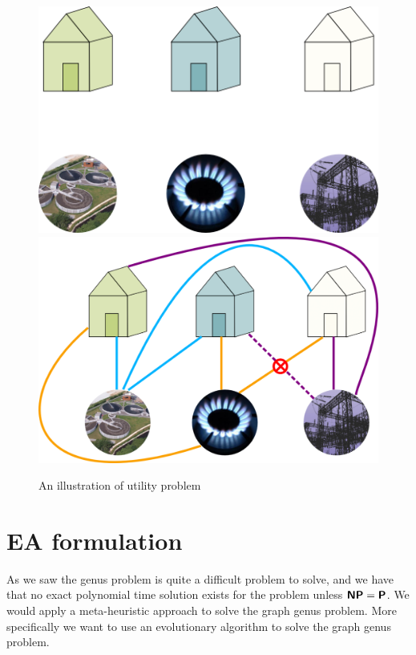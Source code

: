 \documentclass{article}
\newcommand{\classX}[1]{\ensuremath{\text{\textsf{\textbf{#1}}}}}
\newcommand{\classP}{\classX{P}}
\newcommand{\classNP}{\classX{NP}}
\begin{document}
    \begin{figure}[h]
        \centering
        \includegraphics[scale = 0.2]{The-Utilities-Problem.png} 
        \hspace*{1cm}
        \includegraphics[scale = 0.2]{The-Utilities-Problem-Bad-Solution.png} 
        \caption{An illustration of utility problem}
        \label{Fig1}
    \end{figure}
    
\section{EA formulation}\label{sec: EA}

    As we saw the genus problem is quite a difficult problem to solve, and we have that no exact polynomial time solution exists for the problem unless $\classNP = \classP$.
    We would apply a meta-heuristic approach to solve the graph genus problem. More specifically we want to use an evolutionary algorithm to solve the graph genus problem.
    
\end{document}
